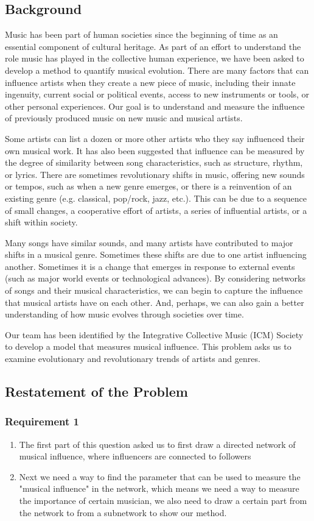 \documentclass{article}
\begin{document}
\subsection{Background}
Music has been part of human societies since the beginning of time as an essential component of
cultural heritage. As part of an effort to understand the role music has played in the collective
human experience, we have been asked to develop a method to quantify musical evolution. There
are many factors that can influence artists when they create a new piece of music, including their
innate ingenuity, current social or political events, access to new instruments or tools, or other
personal experiences. Our goal is to understand and measure the influence of previously
produced music on new music and musical artists.\par
Some artists can list a dozen or more other artists who they say influenced their own musical
work. It has also been suggested that influence can be measured by the degree of similarity
between song characteristics, such as structure, rhythm, or lyrics. There are sometimes
revolutionary shifts in music, offering new sounds or tempos, such as when a new genre
emerges, or there is a reinvention of an existing genre (e.g. classical, pop/rock, jazz, etc.). This
can be due to a sequence of small changes, a cooperative effort of artists, a series of influential
artists, or a shift within society.\par
Many songs have similar sounds, and many artists have contributed to major shifts in a musical
genre. Sometimes these shifts are due to one artist influencing another. Sometimes it is a change
that emerges in response to external events (such as major world events or technological
advances). By considering networks of songs and their musical characteristics, we can begin to
capture the influence that musical artists have on each other. And, perhaps, we can also gain a
better understanding of how music evolves through societies over time.\par
Our team has been identified by the Integrative Collective Music (ICM) Society to develop a
model that measures musical influence. This problem asks us to examine evolutionary and
revolutionary trends of artists and genres.
\subsection{Restatement of the Problem}
\subsubsection{Requirement 1}
\begin{enumerate}
    \item The first part of this question asked us to first draw a  directed network
          of musical influence, where influencers are connected to followers
    \item Next we need a way to find the parameter that can be used to measure the "musical influence" in the network, which means we need a way to measure the
          importance of certain musician, we also need to draw a certain part from the network to from a subnetwork to show our method.
\end{enumerate}
\end{document}

